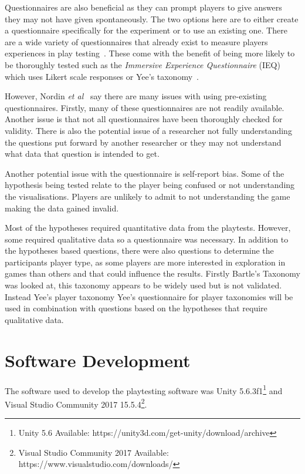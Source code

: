 \documentclass[journal]{IEEEtran}
\begin{document}
	Questionnaires are also beneficial as they can prompt players to give answers they may not have given spontaneously. The two options here are to either create a questionnaire specifically for the experiment or to use an existing one. There are a wide variety of questionnaires that already exist to measure players experiences in play testing~\cite{nordin2014, Jennett2008}. These come with the benefit of being more likely to be thoroughly tested such as the \textit{ Immersive Experience Questionnaire} (IEQ) which uses Likert scale responses or Yee's taxonomy~\cite{nordin2014, Jennett2008, Yee2006, Yee2012}.
	
	However, Nordin \textit{et al}~\cite{nordin2014} say there are many issues with using pre-existing questionnaires. Firstly, many of these questionnaires are not readily available. Another issue is that not all questionnaires have been thoroughly checked for validity. There is also the potential issue of a researcher not fully understanding the questions put forward by another researcher or they may not understand what data that question is intended to get.
	
	Another potential issue with the questionnaire is self-report bias. Some of the hypothesis being tested relate to the player being confused or not understanding the visualisations. Players are unlikely to admit to not understanding the game making the data gained invalid. 
	
	Most of the hypotheses required quantitative data from the playtests. However, some required qualitative data so a questionnaire was necessary.  In addition to the hypotheses based questions, there were also questions to determine the participants player type, as some players are more interested in exploration in games than others and that could influence the results. 
	Firstly Bartle's Taxonomy \cite{Bartle1996} was looked at, this taxonomy appears to be widely used but is not validated. Instead Yee's player taxonomy 
	Yee's questionnaire for player taxonomies will be used in combination with questions based on the hypotheses that require qualitative data. 
	
	
	\section{Software Development} \label{softdev}
	The software used to develop the playtesting software was Unity 5.6.3f1\footnote[3]{Unity 5.6 Available: https://unity3d.com/get-unity/download/archive} and Visual Studio Community 2017  15.5.4\footnote[4]{Visual Studio Community 2017 Available: https://www.visualstudio.com/downloads/}.
	
\end{document}
